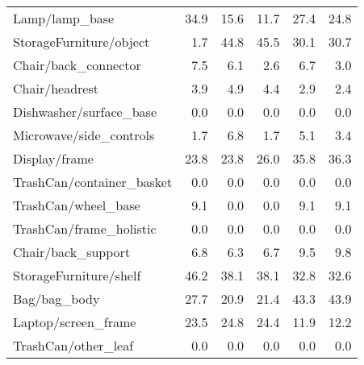 \begin{table}[!h]
\begin{tabular}{lrrrrr}
Lamp/lamp\_base                 &           34.9 &            15.6 &                    11.7 &          27.4 &                  24.8 \\
StorageFurniture/object        &            1.7 &            44.8 &                    45.5 &          30.1 &                  30.7 \\
Chair/back\_connector           &            7.5 &             6.1 &                     2.6 &           6.7 &                   3.0 \\
Chair/headrest                 &            3.9 &             4.9 &                     4.4 &           2.9 &                   2.4 \\
Dishwasher/surface\_base        &            0.0 &             0.0 &                     0.0 &           0.0 &                   0.0 \\
Microwave/side\_controls        &            1.7 &             6.8 &                     1.7 &           5.1 &                   3.4 \\
Display/frame                  &           23.8 &            23.8 &                    26.0 &          35.8 &                  36.3 \\
TrashCan/container\_basket      &            0.0 &             0.0 &                     0.0 &           0.0 &                   0.0 \\
TrashCan/wheel\_base            &            9.1 &             0.0 &                     0.0 &           9.1 &                   9.1 \\
TrashCan/frame\_holistic        &            0.0 &             0.0 &                     0.0 &           0.0 &                   0.0 \\
Chair/back\_support             &            6.8 &             6.3 &                     6.7 &           9.5 &                   9.8 \\
StorageFurniture/shelf         &           46.2 &            38.1 &                    38.1 &          32.8 &                  32.6 \\
Bag/bag\_body                   &           27.7 &            20.9 &                    21.4 &          43.3 &                  43.9 \\
Laptop/screen\_frame            &           23.5 &            24.8 &                    24.4 &          11.9 &                  12.2 \\
TrashCan/other\_leaf            &            0.0 &             0.0 &                     0.0 &           0.0 &                   0.0 \\

\end{tabular}
\end{table}
